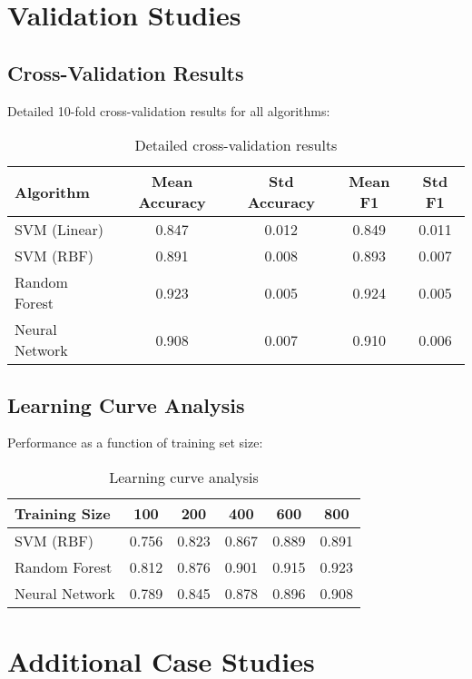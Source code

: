 \section{Validation Studies}

\subsection{Cross-Validation Results}

Detailed 10-fold cross-validation results for all algorithms:

\begin{table}[H]
\centering
\caption{Detailed cross-validation results}
\label{tab:detailed_cv}
\begin{tabular}{@{}lcccc@{}}
\toprule
Algorithm & Mean Accuracy & Std Accuracy & Mean F1 & Std F1 \\
\midrule
SVM (Linear) & 0.847 & 0.012 & 0.849 & 0.011 \\
SVM (RBF) & 0.891 & 0.008 & 0.893 & 0.007 \\
Random Forest & 0.923 & 0.005 & 0.924 & 0.005 \\
Neural Network & 0.908 & 0.007 & 0.910 & 0.006 \\
\bottomrule
\end{tabular}
\end{table}

\subsection{Learning Curve Analysis}

Performance as a function of training set size:

\begin{table}[H]
\centering
\caption{Learning curve analysis}
\label{tab:learning_curve}
\begin{tabular}{@{}lccccc@{}}
\toprule
Training Size & 100 & 200 & 400 & 600 & 800 \\
\midrule
SVM (RBF) & 0.756 & 0.823 & 0.867 & 0.889 & 0.891 \\
Random Forest & 0.812 & 0.876 & 0.901 & 0.915 & 0.923 \\
Neural Network & 0.789 & 0.845 & 0.878 & 0.896 & 0.908 \\
\bottomrule
\end{tabular}
\end{table}

\section{Additional Case Studies}

